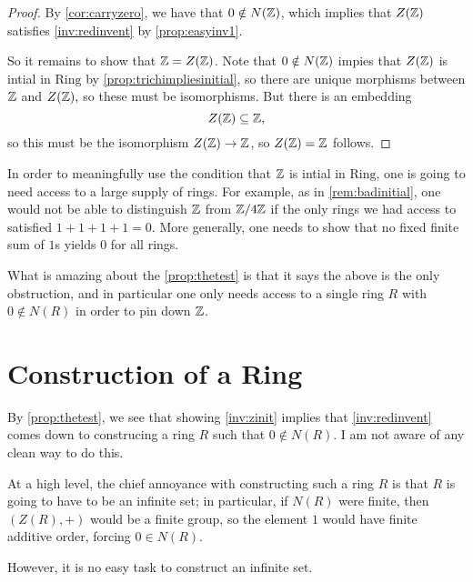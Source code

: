 \documentclass{article}
\begin{document}
\begin{proof}
	By \autoref{cor:carryzero}, we have that $0\notin N(\mathbb Z)$, which implies that $Z(\mathbb Z)$ satisfies \autoref{inv:redinvent} by \autoref{prop:easyinv1}.
	
	So it remains to show that $\mathbb Z=Z(\mathbb Z)$. Note that $0\notin N(\mathbb Z)$ impies that $Z(\mathbb Z)$ is intial in $\mathrm{Ring}$ by \autoref{prop:trichimpliesinitial}, so there are unique morphisms between $\mathbb Z$ and $Z(\mathbb Z),$ so these must be isomorphisms. But there is an embedding
	\[Z(\mathbb Z)\subseteq\mathbb Z,\]
	so this must be the isomorphism $Z(\mathbb Z)\to\mathbb Z$, so $Z(\mathbb Z)=\mathbb Z$ follows.
\end{proof}
\begin{remark}
	In order to meaningfully use the condition that $\mathbb Z$ is intial in $\mathrm{Ring}$, one is going to need access to a large supply of rings. For example, as in \autoref{rem:badinitial}, one would not be able to distinguish $\mathbb Z$ from $\mathbb Z/4\mathbb Z$ if the only rings we had access to satisfied $1+1+1+1=0.$ More generally, one needs to show that no fixed finite sum of $1$s yields $0$ for all rings.

	What is amazing about the \autoref{prop:thetest} is that it says the above is the only obstruction, and in particular one only needs access to a single ring $R$ with $0\notin N(R)$ in order to pin down $\mathbb Z$.
\end{remark}

\section{Construction of a Ring}
By \autoref{prop:thetest}, we see that showing \autoref{inv:zinit} implies that \autoref{inv:redinvent} comes down to construcing a ring $R$ such that $0\notin N(R)$. I am not aware of any clean way to do this.\todo{}

At a high level, the chief annoyance with constructing such a ring $R$ is that $R$ is going to have to be an infinite set; in particular, if $N(R)$ were finite, then $(Z(R),+)$ would be a finite group, so the element $1$ would have finite additive order, forcing $0\in N(R)$.

However, it is no easy task to construct an infinite set.
\end{document}
